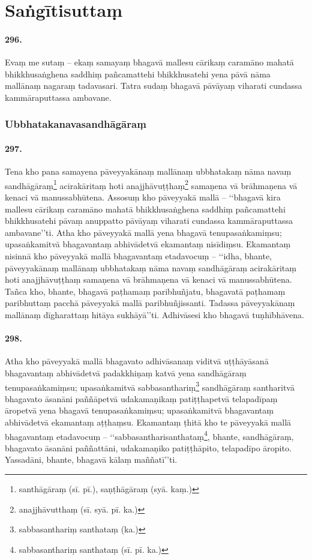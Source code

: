 \section{Saṅgītisuttaṃ}

\paragraph{296.} Evaṃ me sutaṃ – ekaṃ samayaṃ bhagavā mallesu cārikaṃ caramāno mahatā bhikkhusaṅghena saddhiṃ pañcamattehi bhikkhusatehi yena pāvā nāma mallānaṃ nagaraṃ tadavasari. Tatra sudaṃ bhagavā pāvāyaṃ viharati cundassa kammāraputtassa ambavane.

\subsubsection{Ubbhatakanavasandhāgāraṃ}

\paragraph{297.} Tena kho pana samayena pāveyyakānaṃ mallānaṃ ubbhatakaṃ nāma navaṃ sandhāgāraṃ\footnote{santhāgāraṃ (sī. pī.), saṇṭhāgāraṃ (syā. kaṃ.)} acirakāritaṃ hoti anajjhāvuṭṭhaṃ\footnote{anajjhāvutthaṃ (sī. syā. pī. ka.)} samaṇena vā brāhmaṇena vā kenaci vā manussabhūtena. Assosuṃ kho pāveyyakā mallā – ‘‘bhagavā kira mallesu cārikaṃ caramāno mahatā bhikkhusaṅghena saddhiṃ pañcamattehi bhikkhusatehi pāvaṃ anuppatto pāvāyaṃ viharati cundassa kammāraputtassa ambavane’’ti. Atha kho pāveyyakā mallā yena bhagavā tenupasaṅkamiṃsu; upasaṅkamitvā bhagavantaṃ abhivādetvā ekamantaṃ nisīdiṃsu. Ekamantaṃ nisinnā kho pāveyyakā mallā bhagavantaṃ etadavocuṃ – ‘‘idha, bhante, pāveyyakānaṃ mallānaṃ ubbhatakaṃ nāma navaṃ sandhāgāraṃ acirakāritaṃ hoti anajjhāvuṭṭhaṃ samaṇena vā brāhmaṇena vā kenaci vā manussabhūtena. Tañca kho, bhante, bhagavā paṭhamaṃ paribhuñjatu, bhagavatā paṭhamaṃ paribhuttaṃ pacchā pāveyyakā mallā paribhuñjissanti. Tadassa pāveyyakānaṃ mallānaṃ dīgharattaṃ hitāya sukhāyā’’ti. Adhivāsesi kho bhagavā tuṇhībhāvena.

\paragraph{298.} Atha kho pāveyyakā mallā bhagavato adhivāsanaṃ viditvā uṭṭhāyāsanā bhagavantaṃ abhivādetvā padakkhiṇaṃ katvā yena sandhāgāraṃ tenupasaṅkamiṃsu; upasaṅkamitvā sabbasanthariṃ\footnote{sabbasanthariṃ santhataṃ (ka.)} sandhāgāraṃ santharitvā bhagavato āsanāni paññāpetvā udakamaṇikaṃ patiṭṭhapetvā telapadīpaṃ āropetvā yena bhagavā tenupasaṅkamiṃsu; upasaṅkamitvā bhagavantaṃ abhivādetvā ekamantaṃ aṭṭhaṃsu. Ekamantaṃ ṭhitā kho te pāveyyakā mallā bhagavantaṃ etadavocuṃ – ‘‘sabbasantharisanthataṃ\footnote{sabbasanthariṃ santhataṃ (sī. pī. ka.)}, bhante, sandhāgāraṃ, bhagavato āsanāni paññattāni, udakamaṇiko patiṭṭhāpito, telapadīpo āropito. Yassadāni, bhante, bhagavā kālaṃ maññatī’’ti.

